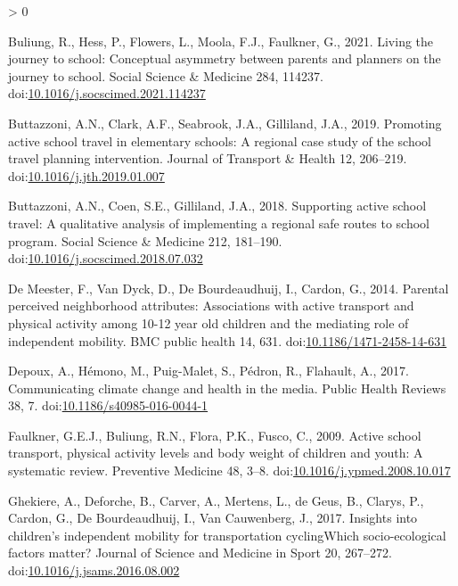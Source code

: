 \documentclass[]{elsarticle} %
\newlength{\cslhangindent}
\newenvironment{CSLReferences}[2] %
 {%
  \setlength{\parindent}{0pt}
  \ifodd #1 \everypar{\setlength{\hangindent}{\cslhangindent}}\ignorespaces\fi
  \ifnum #2 > 0
  \setlength{\parskip}{#2\baselineskip}
  \fi
 }%
 {}
\begin{document}
\hypertarget{refs}{}
\begin{CSLReferences}{1}{0}
\leavevmode\hypertarget{ref-buliungLivingJourneySchool2021}{}%
Buliung, R., Hess, P., Flowers, L., Moola, F.J., Faulkner, G., 2021.
Living the journey to school: Conceptual asymmetry between parents and
planners on the journey to school. Social Science \& Medicine 284,
114237.
doi:\href{https://doi.org/10.1016/j.socscimed.2021.114237}{10.1016/j.socscimed.2021.114237}

\leavevmode\hypertarget{ref-buttazzoniPromotingActiveSchool2019}{}%
Buttazzoni, A.N., Clark, A.F., Seabrook, J.A., Gilliland, J.A., 2019.
Promoting active school travel in elementary schools: A regional case
study of the school travel planning intervention. Journal of Transport
\& Health 12, 206--219.
doi:\href{https://doi.org/10.1016/j.jth.2019.01.007}{10.1016/j.jth.2019.01.007}

\leavevmode\hypertarget{ref-buttazzoniSupportingActiveSchool2018}{}%
Buttazzoni, A.N., Coen, S.E., Gilliland, J.A., 2018. Supporting active
school travel: A qualitative analysis of implementing a regional safe
routes to school program. Social Science \& Medicine 212, 181--190.
doi:\href{https://doi.org/10.1016/j.socscimed.2018.07.032}{10.1016/j.socscimed.2018.07.032}

\leavevmode\hypertarget{ref-demeesterParentalPerceivedNeighborhood2014}{}%
De Meester, F., Van Dyck, D., De Bourdeaudhuij, I., Cardon, G., 2014.
Parental perceived neighborhood attributes: Associations with active
transport and physical activity among 10-12 year old children and the
mediating role of independent mobility. BMC public health 14, 631.
doi:\href{https://doi.org/10.1186/1471-2458-14-631}{10.1186/1471-2458-14-631}

\leavevmode\hypertarget{ref-depouxCommunicatingClimateChange2017}{}%
Depoux, A., Hémono, M., Puig-Malet, S., Pédron, R., Flahault, A., 2017.
Communicating climate change and health in the media. Public Health
Reviews 38, 7.
doi:\href{https://doi.org/10.1186/s40985-016-0044-1}{10.1186/s40985-016-0044-1}

\leavevmode\hypertarget{ref-faulknerActiveSchoolTransport2009}{}%
Faulkner, G.E.J., Buliung, R.N., Flora, P.K., Fusco, C., 2009. Active
school transport, physical activity levels and body weight of children
and youth: A systematic review. Preventive Medicine 48, 3--8.
doi:\href{https://doi.org/10.1016/j.ypmed.2008.10.017}{10.1016/j.ypmed.2008.10.017}

\leavevmode\hypertarget{ref-ghekiereInsightsChildrenIndependent2017}{}%
Ghekiere, A., Deforche, B., Carver, A., Mertens, L., de Geus, B.,
Clarys, P., Cardon, G., De Bourdeaudhuij, I., Van Cauwenberg, J., 2017.
Insights into children's independent mobility for transportation
cycling{{Which}} socio-ecological factors matter? Journal of Science and
Medicine in Sport 20, 267--272.
doi:\href{https://doi.org/10.1016/j.jsams.2016.08.002}{10.1016/j.jsams.2016.08.002}


\end{CSLReferences}
\end{document}
